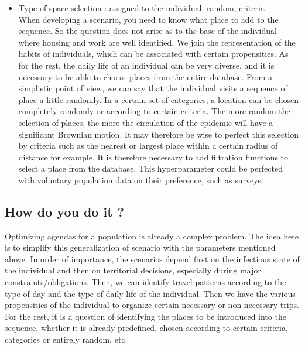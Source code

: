\begin{itemize}
\item Type of space selection : assigned to the individual, random, criteria\\
When developing a scenario, you need to know what place to add to the sequence. So the question does not arise as to the base of the individual where housing and work are well identified. We join the representation of the habits of individuals, which can be associated with certain propensities. As for the rest, the daily life of an individual can be very diverse, and it is necessary to be able to choose places from the entire database. From a simplistic point of view, we can say that the individual visits a sequence of place a little randomly. In a certain set of categories, a location can be chosen completely randomly or according to certain criteria. The more random the selection of places, the more the circulation of the epidemic will have a significant Brownian motion. It may therefore be wise to perfect this selection by criteria such as the nearest or largest place within a certain radius of distance for example. It is therefore necessary to add filtration functions to select a place from the database. This hyperparameter could be perfected with voluntary population data on their preference, such as surveys.\\

\end{itemize}

\subsection{How do you do it ?}

Optimizing agendas for a population is already a complex problem. The idea here is to simplify this generalization of scenario with the parameters mentioned above. In order of importance, the scenarios depend first on the infectious state of the individual and then on territorial decisions, especially during major constraints/obligations. Then, we can identify travel patterns according to the type of day and the type of daily life of the individual. Then we have the various propensities of the individual to organize certain necessary or non-necessary trips. For the rest, it is a question of identifying the places to be introduced into the sequence, whether it is already predefined, chosen according to certain criteria, categories or entirely random, etc.\\

